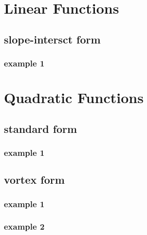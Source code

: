 \documentclass[11pt]{article}
\begin{document}
\begin{flushleft}
\section{Linear Functions}
    \subsection{slope-intersct form}
        \subsubsection{example 1}

\section{Quadratic Functions}
    \subsection{standard form}
        \subsubsection{example 1}
    \subsection{vortex form}
        \subsubsection{example 1}
        \subsubsection{example 2}
\end{flushleft}
\end{document}
